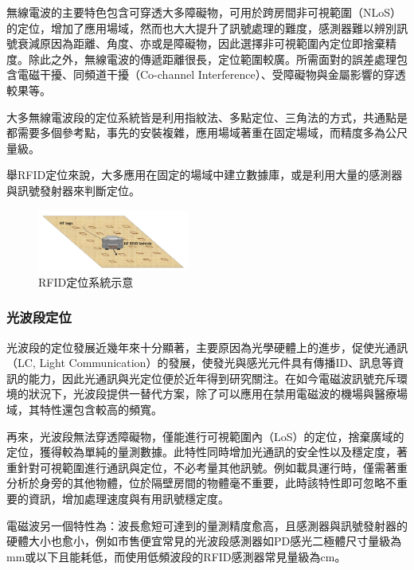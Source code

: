             無線電波的主要特色包含可穿透大多障礙物，可用於跨房間非可視範圍（NLoS）的定位\cite{survey_indoor2018}，增加了應用場域，然而也大大提升了訊號處理的難度，感測器難以辨別訊號衰減原因為距離、角度、亦或是障礙物，因此選擇非可視範圍內定位即捨棄精度。除此之外，無線電波的傳遞距離很長，定位範圍較廣。所需面對的誤差處理包含電磁干擾、同頻道干擾（Co-channel Interference）、受障礙物與金屬影響的穿透較果等。

            大多無線電波段的定位系統皆是利用指紋法、多點定位、三角法的方式，共通點是都需要多個參考點，事先的安裝複雜，應用場域著重在固定場域，而精度多為公尺量級。
        
            舉RFID定位來說，大多應用在固定的場域中建立數據庫，或是利用大量的感測器與訊號發射器來判斷定位\cite{survey_rfid}。

            \begin{figure}[ht]
                \centering
                \includegraphics[width=5cm]{ch2pic/rfid_system.png}
                \caption{RFID定位系統示意\cite{survey_rfid}}
                \label{pic:rfid_system}
            \end{figure}



        \subsubsection{光波段定位}
        \label{chp:light}
            光波段的定位發展近幾年來十分顯著，主要原因為光學硬體上的進步，促使光通訊（LC, Light Communication）的發展，使發光與感光元件具有傳播ID、訊息等資訊的能力，因此光通訊與光定位便於近年得到研究關注。在如今電磁波訊號充斥環境的狀況下，光波段提供一替代方案，除了可以應用在禁用電磁波的機場與醫療場域，其特性還包含較高的頻寬。
            
            
            再來，光波段無法穿透障礙物，僅能進行可視範圍內（LoS）的定位，捨棄廣域的定位，獲得較為單純的量測數據。此特性同時增加光通訊的安全性以及穩定度，著重針對可視範圍進行通訊與定位，不必考量其他訊號。例如載具運行時，僅需著重分析於身旁的其他物體，位於隔壁房間的物體毫不重要，此時該特性即可忽略不重要的資訊，增加處理速度與有用訊號穩定度。


            電磁波另一個特性為：波長愈短可達到的量測精度愈高，且感測器與訊號發射器的硬體大小也愈小，例如市售便宜常見的光波段感測器如PD感光二極體尺寸量級為mm或以下\cite{datasheet:led_sfh4545}且能耗低，而使用低頻波段的RFID感測器常見量級為cm\cite{datasheet:rfid_tag}。


